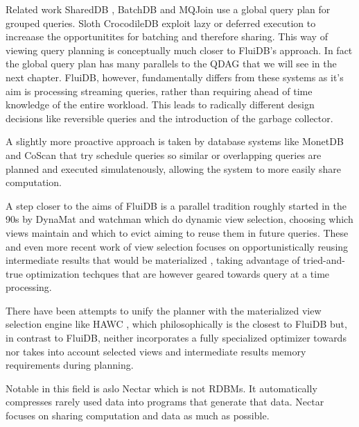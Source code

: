 \begin{corrected}{Related work}
SharedDB \cite{giannikisSharedDBKillingOne2012}, BatchDB
\cite{makreshanskiBatchDBEfficientIsolated2017} and MQJoin
\cite{makreshanskiMqjoinEfficientShared2016a} use a global query plan
for grouped queries. Sloth \cite{cheungSlothBeingLazy2016} CrocodileDB
\cite{shangCrocodileDBEfficientDatabase2020} exploit lazy or deferred
execution to increaase the opportunitites for batching and therefore
sharing. This way of viewing query planning is conceptually much
closer to FluiDB's approach. In fact the global query plan has many
parallels to the QDAG that we will see in the next chapter. FluiDB,
however, fundamentally differs from these systems as it's aim is
processing streaming queries, rather than requiring ahead of time
knowledge of the entire workload. This leads to radically different
design decisions like reversible queries and the introduction of the
garbage collector.

A slightly more proactive approach is taken by database systems like
MonetDB \cite{idreosMonetdbTwoDecades2012} and CoScan
\cite{wangCoscanCooperativeScan2011} that try schedule queries so
similar or overlapping queries are planned and executed
simulatenously, allowing the system to more easily share computation.

A step closer to the aims of FluiDB is a parallel tradition roughly
started in the 90s by DynaMat \cite{kotidisDynamatDynamicView1999} and
watchman \cite{scheuermannWatchmanDataWarehouse1996} which do dynamic
view selection, choosing which views maintain and which to evict
aiming to reuse them in future queries. These and even more recent
work of view selection focuses on opportunistically reusing
intermediate results that would be materialized
\cite{ivanovaArchitectureRecyclingIntermediates2010,nagelRecyclingPipelinedQuery2013},
taking advantage of tried-and-true optimization techques that are
however geared towards query at a time processing.

There have been attempts to unify the planner with the materialized
view selection engine like HAWC
\cite{perezHistoryawareQueryOptimization2014a}, which philosophically
is the closest to FluiDB but, in contrast to FluiDB, neither
incorporates a fully specialized optimizer towards nor takes into
account selected views and intermediate results memory requirements
during planning.

Notable in this field is aslo Nectar
\cite{gundaNectarAutomaticManagement2010} which is not RDBMs. It
automatically compresses rarely used data into programs that generate
that data. Nectar focuses on sharing computation and data as much as
possible.


\end{corrected}
